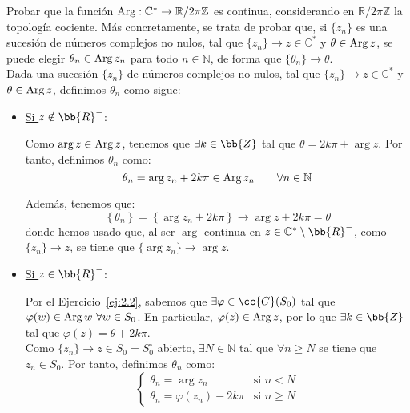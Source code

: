 \begin{ejercicio}
    Probar que la función $\operatorname{Arg} : \mathbb{C}^\ast \to \mathbb{R}/2\pi\mathbb{Z}$ es continua, considerando en $\mathbb{R}/2\pi\mathbb{Z}$ la topología cociente. Más concretamente, se trata de probar que, si $\{z_n\}$ es una sucesión de números complejos no nulos, tal que $\{z_n\} \to z \in \mathbb{C}^\ast$ y $\theta \in \operatorname{Arg} z$, se puede elegir $\theta_n \in \operatorname{Arg} z_n$ para todo $n \in \mathbb{N}$, de forma que $\{\theta_n\} \to \theta$.\\

    Dada una sucesión $\{z_n\}$ de números complejos no nulos, tal que $\{z_n\}\to z\in \mathbb{C}^{\ast}$ y $\theta\in \operatorname{Arg} z$, definimos $\theta_n$ como sigue:
    \begin{itemize}
        \item \ul{Si $z\notin \bb{R}^-$}:
        
        Como $\arg z\in \operatorname{Arg} z$, tenemos que $\exists k\in \bb{Z}$ tal que $\theta=2k\pi+\arg z$. Por tanto, definimos $\theta_n$ como:
        \begin{equation*}
            \theta_n = \arg z_n + 2k\pi \in \operatorname{Arg} z_n\qquad \forall n\in \mathbb{N}
        \end{equation*}

        Además, tenemos que:
        \begin{equation*}
            \left\{\theta_n\right\} = \left\{\arg z_n + 2k\pi\right\}\to \arg z + 2k\pi = \theta
        \end{equation*}
        donde hemos usado que, al ser $\arg$ continua en $z\in \mathbb{C}^{\ast}\setminus \bb{R}^-$, como $\{z_n\}\to z$, se tiene que $\{\arg z_n\}\to \arg z$.
        
        \item \ul{Si $z\in \bb{R}^-$}:
        
        Por el Ejercicio~\ref{ej:2.2}, sabemos que $\exists \varphi\in \cc{C}(S_{0})$ tal que $\varphi(w)\in \operatorname{Arg} w~\forall w\in S_{0}$. En particular, $\varphi(z)\in \operatorname{Arg} z$, por lo que $\exists k\in \bb{Z}$ tal que $\varphi(z)=\theta+2k\pi$.\\

        Como $\{z_n\}\to z\in S_0=S_0^\circ$ abierto, $\exists N\in \mathbb{N}$ tal que $\forall n\geq N$ se tiene que $z_n\in S_{0}$. Por tanto, definimos $\theta_n$ como:
        \begin{equation*}
            \begin{cases}
                \theta_n = \arg z_n & \text{si } n<N\\
                \theta_n = \varphi(z_n)-2k\pi & \text{si } n\geq N
            \end{cases}
        \end{equation*}


\end{itemize}
\end{ejercicio}
